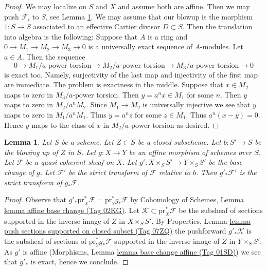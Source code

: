 \documentclass{amsart}
\theoremstyle{plain}
\newtheorem{lemma}[subsection]{Lemma}
\theoremstyle{definition}
\theoremstyle{remark}
\numberwithin{equation}{subsection}
\begin{document}
\begin{proof}
We may localize on $S$ and $X$ and assume both are affine.
Then we may push $\mathcal{F}_i$ to $S$, see
Lemma \ref{divisors-lemma-strict-transform-affine}.
We may assume that our blowup is the morphism $1 : S \to S$
associated to an effective Cartier divisor $D \subset S$.
Then the translation into algebra is the following: Suppose that $A$
is a ring and $0 \to M_1 \to M_2 \to M_3 \to 0$ is a universally
exact sequence of $A$-modules. Let $a\in A$. Then the sequence
$$
0 \to
M_1/a\text{-power torsion} \to
M_2/a\text{-power torsion} \to
M_3/a\text{-power torsion} \to 0
$$
is exact too. Namely, surjectivity of the last map and injectivity of
the first map are immediate. The problem is exactness in the middle.
Suppose that $x \in M_2$ maps to zero in $M_3/a\text{-power torsion}$.
Then $y = a^n x \in M_1$ for some $n$. Then $y$ maps to zero in
$M_2/a^nM_2$. Since $M_1 \to M_2$ is universally injective we see that
$y$ maps to zero in $M_1/a^nM_1$. Thus $y = a^n z$ for some $z \in M_1$.
Thus $a^n(x - y) = 0$. Hence $y$ maps to the class of $x$ in
$M_2/a\text{-power torsion}$ as desired.
\end{proof}


\begin{lemma}
\label{divisors-lemma-strict-transform-affine}
Let $S$ be a scheme. Let $Z \subset S$ be a closed subscheme.
Let $b : S' \to S$ be the blowing up of $Z$ in $S$. Let
$g : X \to Y$ be an affine morphism of schemes over $S$.
Let $\mathcal{F}$ be a quasi-coherent sheaf on $X$.
Let $g' : X \times_S S' \to Y \times_S S'$ be the base change
of $g$. Let $\mathcal{F}'$ be the strict transform of $\mathcal{F}$
relative to $b$. Then $g'_*\mathcal{F}'$ is the strict transform
of $g_*\mathcal{F}$.
\end{lemma}

\begin{proof}
Observe that $g'_*\text{pr}_X^*\mathcal{F} = \text{pr}_Y^*g_*\mathcal{F}$
by Cohomology of Schemes, Lemma \href{https://stacks.math.columbia.edu/tag/02KG}{lemma affine base change (Tag 02KG)}.
Let $\mathcal{K} \subset \text{pr}_X^*\mathcal{F}$ be the subsheaf
of sections supported in the inverse image of $Z$ in $X \times_S S'$.
By Properties, Lemma
\href{https://stacks.math.columbia.edu/tag/07ZQ}{lemma push sections supported on closed subset (Tag 07ZQ)}
the pushforward $g'_*\mathcal{K}$ is the subsheaf of sections of
$\text{pr}_Y^*g_*\mathcal{F}$ supported in the inverse
image of $Z$ in $Y \times_S S'$. As $g'$ is affine
(Morphisms, Lemma \href{https://stacks.math.columbia.edu/tag/01SD}{lemma base change affine (Tag 01SD)})
we see that $g'_*$ is exact, hence we conclude.
\end{proof}
\end{document}
